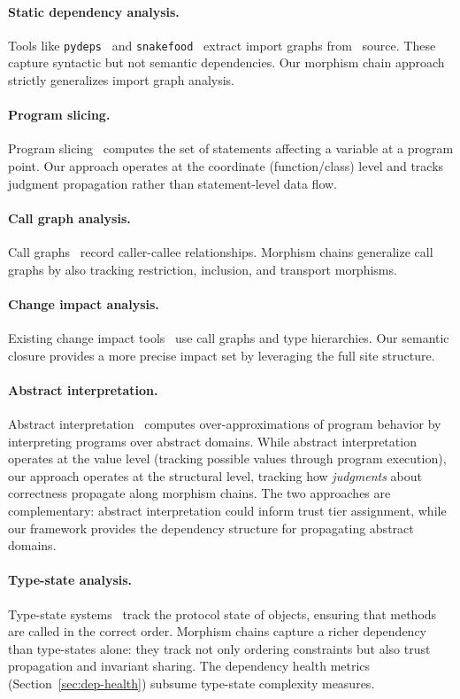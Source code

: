 \documentclass[11pt]{article}
\begin{document}
\paragraph{Static dependency analysis.}
Tools like \texttt{pydeps}~\cite{pydeps} and \texttt{snakefood}~\cite{snakefood}
extract import graphs from \Python\ source.  These capture syntactic but
not semantic dependencies.  Our morphism chain approach strictly generalizes
import graph analysis.

\paragraph{Program slicing.}
Program slicing~\cite{Weiser1984} computes the set of statements affecting
a variable at a program point.  Our approach operates at the coordinate
(function/class) level and tracks judgment propagation rather than
statement-level data flow.

\paragraph{Call graph analysis.}
Call graphs~\cite{Grove2001} record caller-callee relationships.  Morphism
chains generalize call graphs by also tracking restriction, inclusion, and
transport morphisms.

\paragraph{Change impact analysis.}
Existing change impact tools~\cite{Ren2004} use call graphs and type
hierarchies.  Our semantic closure provides a more precise impact set by
leveraging the full site structure.

\paragraph{Abstract interpretation.}
Abstract interpretation~\cite{CousotCousot1977} computes over-approximations
of program behavior by interpreting programs over abstract domains.  While
abstract interpretation operates at the value level (tracking possible
values through program execution), our approach operates at the structural
level, tracking how \emph{judgments} about correctness propagate along
morphism chains.  The two approaches are complementary: abstract
interpretation could inform trust tier assignment, while our framework
provides the dependency structure for propagating abstract domains.

\paragraph{Type-state analysis.}
Type-state systems~\cite{Strom1986} track the protocol state of objects,
ensuring that methods are called in the correct order.  Morphism chains
capture a richer dependency than type-states alone: they track not only
ordering constraints but also trust propagation and invariant sharing.
The dependency health metrics (Section~\ref{sec:dep-health}) subsume
type-state complexity measures.
\end{document}
